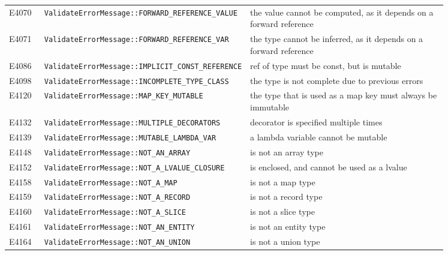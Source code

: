 \begin{longtable}{@{}l p{0.4\linewidth} p{0.45\linewidth}@{}}
E4070 & \texttt{ValidateErrorMessage::\allowbreak{}FORWARD\_\allowbreak{}REFERENCE\_\allowbreak{}VALUE} & the value cannot be computed, as it depends on a forward reference\\
E4071 & \texttt{ValidateErrorMessage::\allowbreak{}FORWARD\_\allowbreak{}REFERENCE\_\allowbreak{}VAR} & the type cannot be inferred, as it depends on a forward reference\\
E4086 & \texttt{ValidateErrorMessage::\allowbreak{}IMPLICIT\_\allowbreak{}CONST\_\allowbreak{}REFERENCE} & ref of type \errhole{} must be const, but is mutable\\
E4098 & \texttt{ValidateErrorMessage::\allowbreak{}INCOMPLETE\_\allowbreak{}TYPE\_\allowbreak{}CLASS} & the type \errhole{} is not complete due to previous errors\\
E4120 & \texttt{ValidateErrorMessage::\allowbreak{}MAP\_\allowbreak{}KEY\_\allowbreak{}MUTABLE} & the type \errhole{} that is used as a map key must always be immutable\\
E4132 & \texttt{ValidateErrorMessage::\allowbreak{}MULTIPLE\_\allowbreak{}DECORATORS} & decorator \errhole{} is specified multiple times\\
E4139 & \texttt{ValidateErrorMessage::\allowbreak{}MUTABLE\_\allowbreak{}LAMBDA\_\allowbreak{}VAR} & a lambda variable cannot be mutable\\
E4148 & \texttt{ValidateErrorMessage::\allowbreak{}NOT\_\allowbreak{}AN\_\allowbreak{}ARRAY} & \errhole{} is not an array type\\
E4152 & \texttt{ValidateErrorMessage::\allowbreak{}NOT\_\allowbreak{}A\_\allowbreak{}LVALUE\_\allowbreak{}CLOSURE} & \errhole{} is enclosed, and cannot be used as a lvalue\\
E4158 & \texttt{ValidateErrorMessage::\allowbreak{}NOT\_\allowbreak{}A\_\allowbreak{}MAP} & \errhole{} is not a map type\\
E4159 & \texttt{ValidateErrorMessage::\allowbreak{}NOT\_\allowbreak{}A\_\allowbreak{}RECORD} & \errhole{} is not a record type\\
E4160 & \texttt{ValidateErrorMessage::\allowbreak{}NOT\_\allowbreak{}A\_\allowbreak{}SLICE} & \errhole{} is not a slice type\\
E4161 & \texttt{ValidateErrorMessage::\allowbreak{}NOT\_\allowbreak{}AN\_\allowbreak{}ENTITY} & \errhole{} is not an entity type\\
E4164 & \texttt{ValidateErrorMessage::\allowbreak{}NOT\_\allowbreak{}AN\_\allowbreak{}UNION} & \errhole{} is not a union type\\

\end{longtable}
